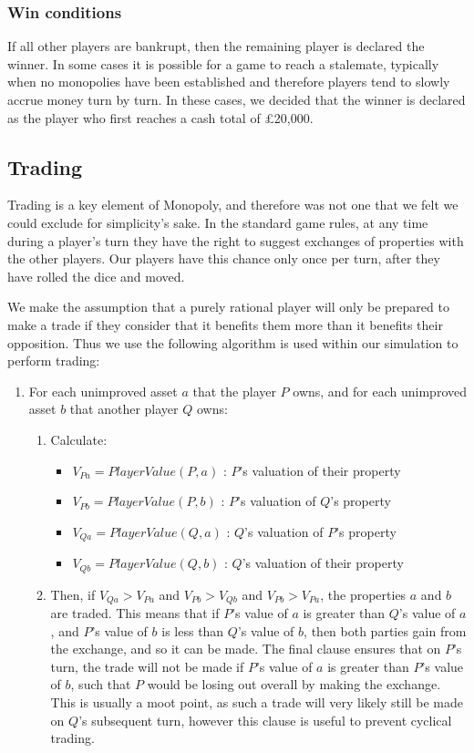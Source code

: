 \documentclass[11pt,a4paper,twocolumn]{scrartcl}
\begin{document}
\subsubsection{Win conditions}

If all other players are bankrupt, then the remaining player is declared the winner. In some cases it is possible for a game to reach a stalemate, typically when no monopolies have been established and therefore players tend to slowly accrue money turn by turn. In these cases, we decided that the winner is declared as the player who first reaches a cash total of \pounds 20,000.

\subsection{Trading}

Trading is a key element of Monopoly, and therefore was not one that we felt we could exclude for simplicity's sake. In the standard game rules, at any time during a player's turn they have the right to suggest exchanges of properties with the other players. Our players have this chance only once per turn, after they have rolled the dice and moved. 

We make the assumption that a purely rational player will only be prepared to make a trade if they consider that it benefits them more than it benefits their opposition. Thus we use the following algorithm is used within our simulation to perform trading:

\begin{enumerate}
\item For each unimproved asset $a$ that the player $P$ owns, and for each unimproved asset $b$ that another player $Q$ owns: 
\begin{enumerate}
\item Calculate:
\begin{itemize}
\item $V_{Pa} = PlayerValue(P, a)$ : $P$'s valuation of their property
\item $V_{Pb} = PlayerValue(P, b)$ : $P$'s valuation of $Q$'s property
\item $V_{Qa} = PlayerValue(Q, a)$ : $Q$'s valuation of $P$'s property
\item $V_{Qb} = PlayerValue(Q, b)$ : $Q$'s valuation of their property
\end{itemize}

\item Then, if $V_{Qa} > V_{Pa}$ and $V_{Pb} > V_{Qb}$ and $V_{Pb} > V_{Pa}$, the properties $a$ and $b$ are traded. This means that if $P$'s value of $a$ is greater than $Q$'s value of $a$, and $P$'s value of $b$ is less than $Q$'s value of $b$, then both parties gain from the exchange, and so it can be made. The final clause ensures that on $P$'s turn, the trade will not be made if $P$'s value of $a$ is greater than $P$'s value of $b$, such that $P$ would be losing out overall by making the exchange. This is usually a moot point, as such a trade will very likely still be made on $Q$'s subsequent turn, however this clause is useful to prevent cyclical trading.
\end{enumerate}
\end{enumerate}
\end{document}
